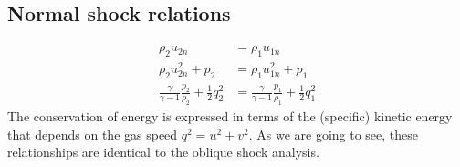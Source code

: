 \subsection{Normal shock relations}
\begin{align}
    \rho_2 u_{2n}                                                   & = \rho_1 u_{1n}                                                   \\
    \rho_2 u^2_{2n} + p_2                                           & = \rho_1 u^2_{1n} + p_1                                           \\
    \frac{\gamma}{\gamma - 1}\frac{p_2}{\rho_2} + \frac{1}{2} q^2_2 & = \frac{\gamma}{\gamma - 1} \frac{p_1}{\rho_1} + \frac{1}{2}q^2_1
\end{align}
The conservation of energy is expressed in terms of the (specific) kinetic energy that depends on the gas speed $q^2 = u^2 + v^2$. As we are going to see, these relationships are identical to the oblique shock analysis.
